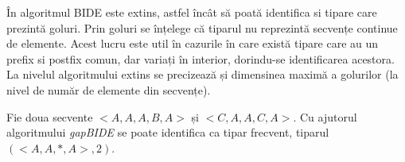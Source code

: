 În \cite{bib:gapbide} algoritmul BIDE este extins, astfel încât să poată identifica si tipare care prezintă goluri. Prin goluri se înțelege că tiparul nu reprezintă secvențe continue de elemente. Acest lucru este util în cazurile în care există tipare care au un prefix si postfix comun, dar variați în interior, dorindu-se identificarea acestora. La nivelul algoritmului extins se precizează și dimensinea maximă a golurilor (la nivel de număr de elemente din secvențe). 

\begin{ex}  
Fie doua secvente $<A, A, A, B, A>$ și $<C, A, A, C, A>$. Cu ajutorul algoritmului \textit{gapBIDE} se poate identifica ca tipar frecvent, tiparul $(<A, A, *, A>, 2)$.
\end{ex}